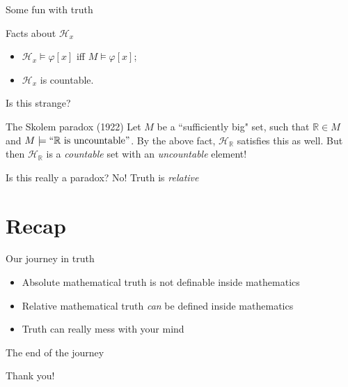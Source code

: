 \documentclass{beamer}
\begin{document}
\begin{frame}{Some fun with truth}
  \begin{block}{Facts about $\mathcal H_x$}
    \begin{itemize}
      \item $\mathcal H_x\models\varphi[x]$ iff $M\models\varphi[x]$;
      \pause\item $\mathcal H_x$ is countable.
    \end{itemize}
  \end{block}

  \pause Is this strange?

  \pause\begin{block}{The Skolem paradox (1922)}
    Let $M$ be a ``sufficiently big" set, such that $\mathbb R\in M$ and $M\models``\mathbb R\text{ is uncountable}"$. By the above fact, $\mathcal H_{\mathbb R}$ satisfies this as well. \pause But then $\mathcal H_{\mathbb R}$ is a \textit{countable} set with an \textit{uncountable} element!
  \end{block}

  \pause Is this really a paradox? \pause No! Truth is \textit{relative}

\end{frame}

\section{Recap}
\begin{frame}{Our journey in truth}
  \begin{itemize}
    \pause\item Absolute mathematical truth is not definable inside mathematics
    \pause\item Relative mathematical truth \textit{can} be defined inside mathematics
    \pause\item Truth can really mess with your mind
  \end{itemize}
\end{frame}

\begin{frame}{The end of the journey}
  \begin{center}
    {\Large Thank you!}
  \end{center}
\end{frame}
\end{document}
